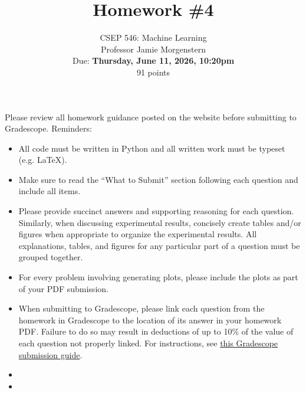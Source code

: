 \documentclass{article}
\begin{document}
\setcounter{aprob}{0}
\title{Homework \#4}
\author{
    \normalsize{CSEP 546: Machine Learning}\\
    \normalsize{Professor Jamie Morgenstern}\\
    \normalsize{Due: \textbf{Thursday, June 11, 2026, 10:20pm}}\\
    \normalsize{91 points}
}
\date{{}}
\maketitle

\noindent Please review all homework guidance posted on the website before submitting to Gradescope. Reminders:
\begin{itemize}
    \item All code must be written in Python and all written work must be typeset (e.g. \LaTeX{}).
    \item Make sure to read the ``What to Submit'' section following each question and include all items.
    \item Please provide succinct answers and supporting reasoning for each question. Similarly, when discussing experimental results, concisely create tables and/or figures when appropriate to organize the experimental results. All explanations, tables, and figures for any particular part of a question must be grouped together.
    \item For every problem involving generating plots, please include the plots as part of your PDF submission.
    \item When submitting to Gradescope, please link each question from the homework in Gradescope to the location of its answer in your homework PDF. Failure to do so may result in deductions of up to 10\% of the value of each question not properly linked. For instructions, see \href{https://www.gradescope.com/get_started#student-submission}{this Gradescope submission guide}.
    \item {}
    \item {}
\end{itemize}
\end{document}
